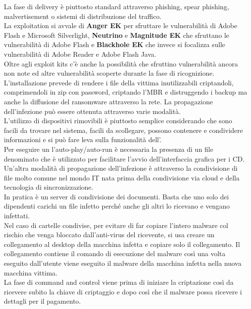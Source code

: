 La fase di delivery è piuttosto standard attraverso phishing, spear phishing, malvertisement o sistemi di distribuzione del traffico.\\
La exploitation si avvale di \textbf{Anger EK} per sfruttare le vulnerabilità di Adobe Flash e Microsoft Silverlight, \textbf{Neutrino} e \textbf{Magnitude EK} che sfruttano le vulnerabilità di Adobe Flash e \textbf{Blackhole EK} che invece si focalizza sulle vulnerabilità di Adobe Reader e Adobe Flash Java.\\
Oltre agli exploit kits c'è anche la possibilità che sfruttino vulnerabilità ancora non note  ed altre vulnerabilità scoperte durante la fase di ricognizione.\\
L'installazione prevede di rendere i file della vittima inutilizzabili criptandoli, comprimendoli in zip con password, criptando l'\acrshort{MBR} e distruggendo i backup ma anche la diffusione del ransomware attraverso la rete.
La propagazione dell'infezione può essere ottenuta attraverso varie modalità.\\
L'utilizzo di dispositivi rimovibili è piuttosto semplice considerando che sono facili da trovare nel sistema, facili da scollegare, possono contenere e condividere informazioni e si può fare leva sulla funzionalità dell'.\\
Per eseguire un l'auto-play/auto-run è necessaria la presenza di un file denominato  che è utilizzato per facilitare l'avvio dell'interfaccia grafica per i CD.\\
Un'altra modalità di propagazione dell'infezione è attraverso la condivisione di file molto comune nel mondo IT nata prima della condivisione via cloud e della tecnologia di sincronizzazione.\\
In pratica è un server di condivisione dei documenti.
Basta che uno solo dei dipendenti carichi un file infetto perché anche gli altri lo ricevano e vengano infettati.\\
Nel caso di cartelle condivise, per evitare di far copiare l'intero malware col rischio che venga bloccato dall'anti-virus del ricevente, si usa creare un collegamento al desktop della macchina infetta e copiare solo il collegamento.
Il collegamento contiene il comando di esecuzione del malware così una volta eseguito dall'utente viene eseguito il malware della macchina infetta nella nuova macchina vittima.\\
La fase di command and control viene prima di iniziare la criptazione così da ricevere subito la chiave di criptaggio e dopo così che il malware possa ricevere i dettagli per il pagamento.
